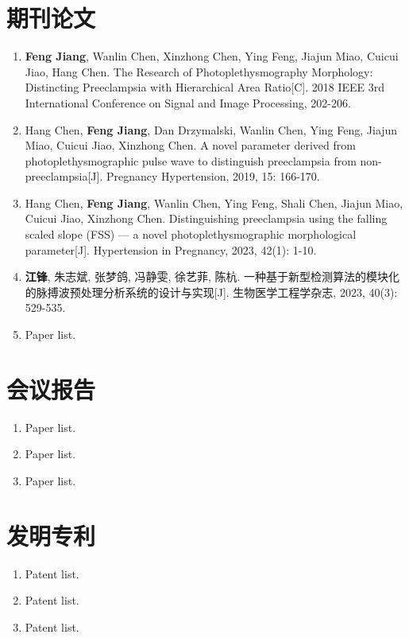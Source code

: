 {%
    \section*{期刊论文}
    \begin{enumerate}
        \item \textbf{Feng Jiang}, Wanlin Chen, Xinzhong Chen, Ying Feng, Jiajun Miao, Cuicui Jiao, Hang Chen. The Research of 
        Photoplethysmography Morphology: Distincting Preeclampsia with Hierarchical Area Ratio[C]. 
        2018 IEEE 3rd International Conference on Signal and Image Processing, 202-206.
        \item Hang Chen, \textbf{Feng Jiang}, Dan Drzymalski, Wanlin Chen, Ying Feng, Jiajun Miao, Cuicui Jiao, Xinzhong Chen. 
        A novel parameter derived from photoplethysmographic pulse wave to distinguish preeclampsia from non-preeclampsia[J]. 
        Pregnancy Hypertension, 2019, 15: 166-170.
        \item Hang Chen, \textbf{Feng Jiang}, Wanlin Chen, Ying Feng, Shali Chen, Jiajun Miao, Cuicui Jiao, Xinzhong Chen. 
        Distinguishing preeclampsia using the falling scaled slope (FSS) --- a novel photoplethysmographic morphological parameter[J]. 
        Hypertension in Pregnancy, 2023, 42(1): 1-10.
        \item \textbf{江锋}, 朱志斌, 张梦鸽, 冯静雯, 徐艺菲, 陈杭. 一种基于新型检测算法的模块化的脉搏波预处理分析系统的设计与实现[J]. 
        生物医学工程学杂志, 2023, 40(3): 529-535.
        \item Paper list.
    \end{enumerate}

    \section*{会议报告}
    \begin{enumerate}
        \item Paper list.
        \item Paper list.
        \item Paper list.
    \end{enumerate}

    \section*{发明专利}
    \begin{enumerate}
        \item Patent list.
        \item Patent list.
        \item Patent list.
    \end{enumerate}
}